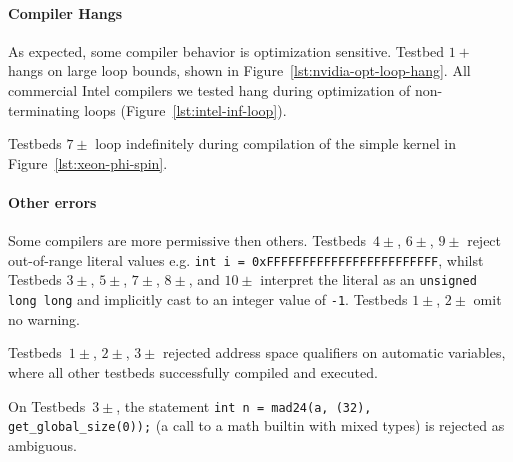 \paragraph{Compiler Hangs} %
As expected, some compiler behavior is optimization sensitive. Testbed $1+$ hangs on large loop bounds, shown in Figure~\ref{lst:nvidia-opt-loop-hang}. All commercial Intel compilers we tested hang during optimization of non-terminating loops (Figure~\ref{lst:intel-inf-loop}).

Testbeds $7\pm$ loop indefinitely during compilation of the simple kernel in Figure~\ref{lst:xeon-phi-spin}.

\paragraph{Other errors} %

Some compilers are more permissive then others. Testbeds~$4\pm$, $6\pm$, $9\pm$ reject out-of-range literal values e.g. \texttt{int i = 0xFFFFFFFFFFFFFFFFFFFFFFFF}, whilst Testbeds $3\pm$, $5\pm$, $7\pm$, $8\pm$, and $10\pm$ interpret the literal as an \texttt{unsigned long long} and implicitly cast to an integer value of \texttt{-1}. Testbeds $1\pm$, $2\pm$ omit no warning.

Testbeds~$1\pm$, $2\pm$, $3\pm$ rejected address space qualifiers on automatic variables, where all other testbeds successfully compiled and executed.

On Testbeds~$3\pm$, the statement \texttt{int n = mad24(a, (32), get\_global\_size(0));} (a call to a math builtin with mixed types) is rejected as ambiguous.


%
%


